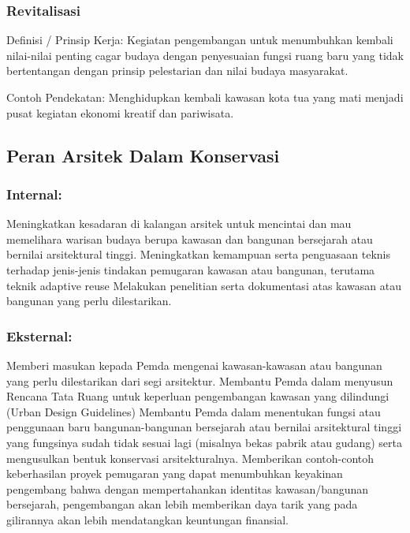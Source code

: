 \documentclass[../rumukota.tex]{subfiles}
\begin{document}
\subsubsection{Revitalisasi}%
\label{ssub:revitalisasi}

Definisi / Prinsip Kerja: Kegiatan pengembangan untuk menumbuhkan kembali nilai-nilai penting cagar budaya dengan penyesuaian fungsi ruang baru yang tidak bertentangan dengan prinsip pelestarian dan nilai budaya masyarakat.

Contoh Pendekatan: Menghidupkan kembali kawasan kota tua yang mati menjadi pusat kegiatan ekonomi kreatif dan pariwisata.

\subsection{Peran Arsitek Dalam Konservasi}%
\label{sub:Peran Arsitek Dalam Konservasi}

\subsubsection{Internal:}%
\label{ssub:internal:}

Meningkatkan kesadaran di kalangan arsitek untuk mencintai dan mau memelihara warisan budaya berupa kawasan dan bangunan bersejarah atau bernilai arsitektural tinggi.
Meningkatkan kemampuan serta penguasaan teknis terhadap jenis-jenis tindakan pemugaran kawasan atau bangunan, terutama teknik adaptive reuse
Melakukan penelitian serta dokumentasi atas kawasan atau bangunan yang perlu dilestarikan.

\subsubsection{Eksternal:}%
\label{ssub:eksternal:}


Memberi masukan kepada Pemda mengenai kawasan-kawasan atau bangunan yang perlu dilestarikan dari segi arsitektur.
Membantu Pemda dalam menyusun Rencana Tata Ruang untuk keperluan pengembangan kawasan yang dilindungi (Urban Design Guidelines)
Membantu Pemda dalam menentukan fungsi atau penggunaan baru bangunan-bangunan bersejarah atau bernilai arsitektural tinggi yang fungsinya sudah tidak sesuai lagi (misalnya bekas pabrik atau gudang) serta mengusulkan bentuk konservasi arsitekturalnya.
Memberikan contoh-contoh keberhasilan proyek pemugaran yang dapat menumbuhkan keyakinan pengembang bahwa dengan mempertahankan identitas kawasan/bangunan bersejarah, pengembangan akan lebih memberikan daya tarik yang pada gilirannya akan lebih mendatangkan keuntungan finansial.
\end{document}
